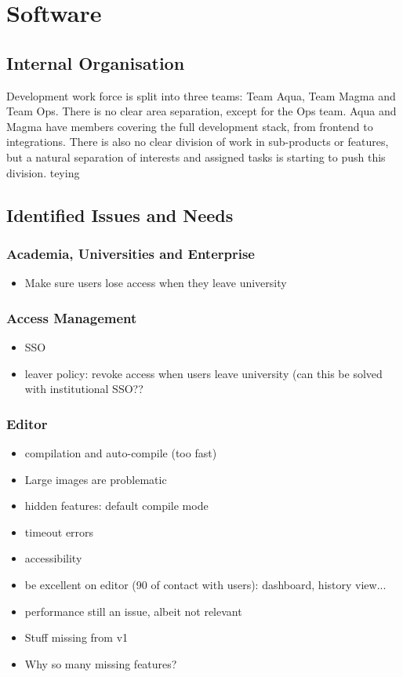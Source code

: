 \documentclass[11pt,a4paper,parskip=half]{scrartcl}
\begin{document}
\section{Software}

\subsection{Internal Organisation}
Development work force is split into three teams: Team Aqua, Team Magma and Team Ops. There is no clear area separation, except for the Ops team. Aqua and Magma have members covering the full development stack, from frontend to integrations. There is also no clear division of work in sub-products or features, but a natural separation of interests and assigned tasks is starting to push this division. teying 

\subsection{Identified Issues and Needs}
\subsubsection{Academia, Universities and Enterprise}
\begin{itemize}
\item Make sure users lose access when they leave university
\end{itemize}
\subsubsection{Access Management}
\begin{itemize}
\item SSO
\item leaver policy: revoke access when users leave university (can this be solved with institutional SSO??
\end{itemize}
\subsubsection{Editor}
\begin{itemize}
\item compilation and auto-compile (too fast)
\item Large images are problematic
\item hidden features: default compile mode
\item timeout errors
\item accessibility
\item be excellent on editor (90 of contact with users): dashboard, history view...
\item performance still an issue, albeit not relevant
\item Stuff missing from v1
\item Why so many missing features?
\end{itemize}
\end{document}
